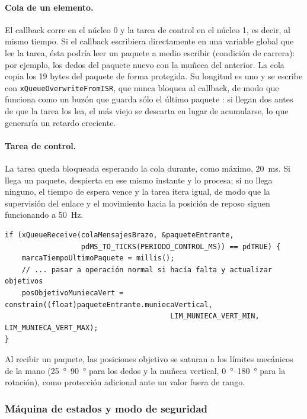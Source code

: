 \paragraph{Cola de un elemento.} El callback corre en el núcleo 0 y la tarea de control en el núcleo 1, es decir, al mismo tiempo. Si el callback escribiera directamente en una variable global que lee la tarea, ésta podría leer un paquete a medio escribir (condición de carrera): por ejemplo, los dedos del paquete nuevo con la muñeca del anterior. La cola copia los 19 bytes del paquete de forma protegida. Su longitud es uno y se escribe con \texttt{xQueueOverwriteFromISR}, que nunca bloquea al callback, de modo que funciona como un buzón que guarda sólo el último paquete \cite{freertos}: si llegan dos antes de que la tarea los lea, el más viejo se descarta en lugar de acumularse, lo que generaría un retardo creciente.

\paragraph{Tarea de control.} La tarea queda bloqueada esperando la cola durante, como máximo, \SI{20}{\milli\second}. Si llega un paquete, despierta en ese mismo instante y lo procesa; si no llega ninguno, el tiempo de espera vence y la tarea itera igual, de modo que la supervisión del enlace y el movimiento hacia la posición de reposo siguen funcionando a \SI{50}{\hertz}.

\begin{lstlisting}[caption={Espera de paquetes en la tarea de control.}, label={cod:cola}]
if (xQueueReceive(colaMensajesBrazo, &paqueteEntrante,
                  pdMS_TO_TICKS(PERIODO_CONTROL_MS)) == pdTRUE) {
    marcaTiempoUltimoPaquete = millis();
    // ... pasar a operación normal si hacía falta y actualizar objetivos
    posObjetivoMuniecaVert = constrain((float)paqueteEntrante.muniecaVertical,
                                       LIM_MUNIECA_VERT_MIN, LIM_MUNIECA_VERT_MAX);
}
\end{lstlisting}

Al recibir un paquete, las posiciones objetivo se saturan a los límites mecánicos de la mano (\SIrange{25}{90}{\degree} para los dedos y la muñeca vertical, \SIrange{0}{180}{\degree} para la rotación), como protección adicional ante un valor fuera de rango.

\subsubsection{Máquina de estados y modo de seguridad}
\label{sec:fsm}

